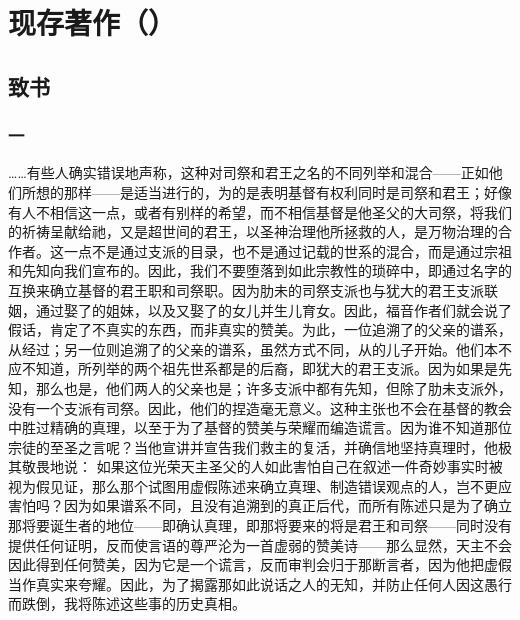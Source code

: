 
\chapter{现存著作（）}



\section{致书}


\subsection{一}

……有些人确实错误地声称，这种对司祭和君王之名的不同列举和混合——正如他们所想的那样——是适当进行的，为的是表明基督有权利同时是司祭和君王；好像有人不相信这一点，或者有别样的希望，而不相信基督是他圣父的大司祭，将我们的祈祷呈献给祂，又是超世间的君王，以圣神治理他所拯救的人，是万物治理的合作者。这一点不是通过支派的目录，也不是通过记载的世系的混合，而是通过宗祖和先知向我们宣布的。因此，我们不要堕落到如此宗教性的琐碎中，即通过名字的互换来确立基督的君王职和司祭职。因为肋未的司祭支派也与犹大的君王支派联姻，通过娶了的姐妹，以及又娶了的女儿并生儿育女。因此，福音作者们就会说了假话，肯定了不真实的东西，而非真实的赞美。为此，一位追溯了的父亲的谱系，从经过；另一位则追溯了的父亲的谱系，虽然方式不同，从的儿子开始。他们本不应不知道，所列举的两个祖先世系都是的后裔，即犹大的君王支派。因为如果是先知，那么也是，他们两人的父亲也是；许多支派中都有先知，但除了肋未支派外，没有一个支派有司祭。因此，他们的捏造毫无意义。这种主张也不会在基督的教会中胜过精确的真理，以至于为了基督的赞美与荣耀而编造谎言。因为谁不知道那位宗徒的至圣之言呢？当他宣讲并宣告我们救主的复活，并确信地坚持真理时，他极其敬畏地说： 如果这位光荣天主圣父的人如此害怕自己在叙述一件奇妙事实时被视为假见证，那么那个试图用虚假陈述来确立真理、制造错误观点的人，岂不更应害怕吗？因为如果谱系不同，且没有追溯到的真正后代，而所有陈述只是为了确立那将要诞生者的地位——即确认真理，即那将要来的将是君王和司祭——同时没有提供任何证明，反而使言语的尊严沦为一首虚弱的赞美诗——那么显然，天主不会因此得到任何赞美，因为它是一个谎言，反而审判会归于那断言者，因为他把虚假当作真实来夸耀。因此，为了揭露那如此说话之人的无知，并防止任何人因这愚行而跌倒，我将陈述这些事的历史真相。\par


